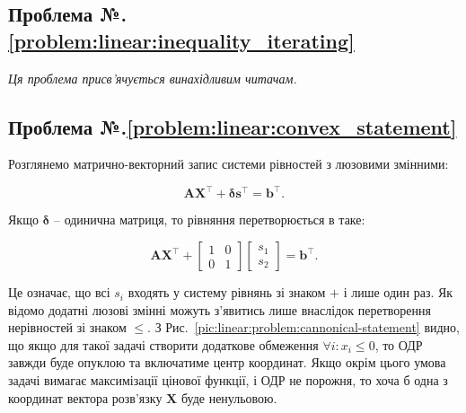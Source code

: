 \documentclass[\main/book.tex]{subfiles}
\begin{document}
\subsection*{Проблема №.\ref{problem:linear:inequality_iterating}}

\textit{Ця проблема присв'ячується винахідливим читачам.}

\subsection*{Проблема №.\ref{problem:linear:convex_statement}}

Розглянемо матрично-векторний запис системи рівностей з люзовими змінними:

\[
 \mathbf{A} \mathbf{X}^\top + \mathbf{\delta} \mathbf{s}^\top = \mathbf{b}^\top\text{.}
\]

Якщо $\mathbf{\delta}$ -- одинична матриця, то рівняння перетворюється в таке:


\[
 \mathbf{A} \mathbf{X}^\top +
 \left[
  \begin{array}{cc}
   1 & 0 \\
   0 & 1
  \end{array}
 \right]
 \left[
  \begin{array}{c}
   s_1 \\
   s_2
  \end{array}
 \right] = \mathbf{b}^\top\text{.}
\]

Це означає, що всі $s_i$ входять у систему рівнянь зі знаком \flqq{}$+$\frqq{} і лише один раз. Як відомо додатні люзові змінні можуть з'явитись лише внаслідок перетворення нерівностей зі знаком \flqq{}$\leq$\frqq{}. З Рис.~\ref{pic:linear:problem:cannonical-statement} видно, що якщо для такої задачі створити додаткове обмеження $\forall i: x_i \leq 0$, то ОДР завжди буде опуклою та включатиме центр координат. Якщо окрім цього умова задачі вимагає максимізації цінової функції, і ОДР не порожня, то хоча б одна з координат вектора розв'язку $\mathbf{X}$ буде ненульовою.
\end{document}
